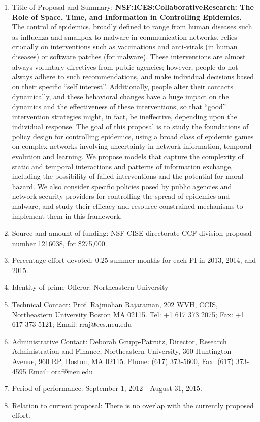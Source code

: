 \begin{enumerate}
\item Title of Proposal and Summary: {\bf
  NSF:ICES:CollaborativeResearch: The Role of Space, Time, and
  Information in Controlling Epidemics.} The control of epidemics,
  broadly defined to range from human diseases such as influenza and
  smallpox to malware in communication networks, relies crucially on
  interventions such as vaccinations and anti-virals (in human
  diseases) or software patches (for malware). These interventions are
  almost always voluntary directives from public agencies; however,
  people do not always adhere to such recommendations, and make
  individual decisions based on their specific “self interest”.
  Additionally, people alter their contacts dynamically, and these
  behavioral changes have a huge impact on the dynamics and the
  effectiveness of these interventions, so that “good” intervention
  strategies might, in fact, be ineffective, depending upon the
  individual response.  The goal of this proposal is to study the
  foundations of policy design for controlling epidemics, using a
  broad class of epidemic games on complex networks involving
  uncertainty in network information, temporal evolution and learning.
  We propose models that capture the complexity of static and temporal
  interactions and patterns of information exchange, including the
  possibility of failed interventions and the potential for moral
  hazard.  We also consider specific policies posed by public agencies
  and network security providers for controlling the spread of
  epidemics and malware, and study their efficacy and resource
  constrained mechanisms to implement them in this framework.
\item Source and amount of funding: NSF CISE directorate CCF division
  proposal number 1216038, for \$275,000.
\item Percentage effort devoted: 0.25 summer months for each PI in 2013, 2014, and 2015.
\item Identity of prime Offeror: Northeastern University
\item Technical Contact: Prof. Rajmohan Rajaraman,  202 WVH, CCIS, Northeastern University
Boston MA 02115.  Tel: +1 617 373 2075;  Fax: +1 617 373 5121;  Email: rraj@ccs.neu.edu 
\item Administrative Contact: Deborah Grupp-Patrutz, Director,
  Research Administration and Finance, Northeastern University, 360
  Huntington Avenue, 960 RP, Boston, MA 02115. Phone: (617) 373-5600,
  Fax: (617) 373-4595 Email: oraf@neu.edu
\item  Period of performance: September 1, 2012 - August 31, 2015.
\item Relation to current proposal: There is no overlap with the currently proposed effort.
\end{enumerate}

